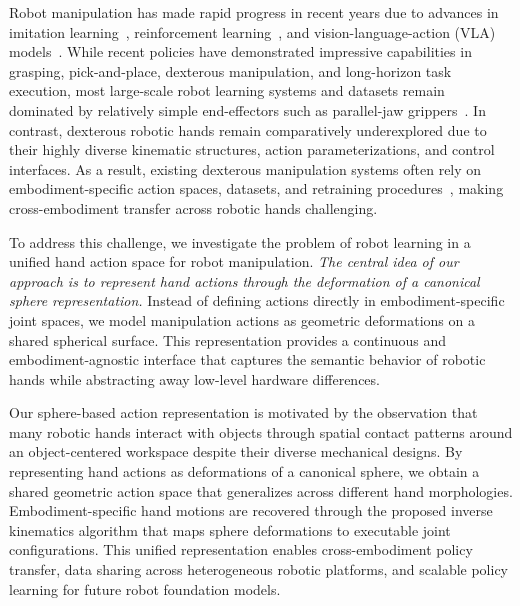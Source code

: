 Robot manipulation has made rapid progress in recent years due to advances in imitation learning~\cite{zhao2023learning,chi2025diffusion}, reinforcement learning~\cite{kalashnikov2018scalable,singh2024dextrah}, and vision-language-action (VLA) models~\cite{kim2024openvla,black2024pi0visionlanguageactionflowmodel,intelligence2025pi05}. While recent policies have demonstrated impressive capabilities in grasping, pick-and-place, dexterous manipulation, and long-horizon task execution, most large-scale robot learning systems and datasets remain dominated by relatively simple end-effectors such as parallel-jaw grippers~\cite{brohan2022rt1,brohan2023rt2visionlanguageactionmodelstransfer,team2024octo,o2024open,khazatsky2024droid}. In contrast, dexterous robotic hands remain comparatively underexplored due to their highly diverse kinematic structures, action parameterizations, and control interfaces. As a result, existing dexterous manipulation systems often rely on embodiment-specific action spaces, datasets, and retraining procedures~\cite{wen2025grdextertechnicalreport,zhang2026dexora,zheng2026egoscale}, making cross-embodiment transfer across robotic hands challenging.




To address this challenge, we investigate the problem of robot learning in a unified hand action space for robot manipulation. \emph{The central idea of our approach is to represent hand actions through the deformation of a canonical sphere representation.} Instead of defining actions directly in embodiment-specific joint spaces, we model manipulation actions as geometric deformations on a shared spherical surface. This representation provides a continuous and embodiment-agnostic interface that captures the semantic behavior of robotic hands while abstracting away low-level hardware differences.

Our sphere-based action representation is motivated by the observation that many robotic hands interact with objects through spatial contact patterns around an object-centered workspace despite their diverse mechanical designs. By representing hand actions as deformations of a canonical sphere, we obtain a shared geometric action space that generalizes across different hand morphologies. Embodiment-specific hand motions are recovered through the proposed inverse kinematics algorithm that maps sphere deformations to executable joint configurations. This unified representation enables cross-embodiment policy transfer, data sharing across heterogeneous robotic platforms, and scalable policy learning for future robot foundation models. 


